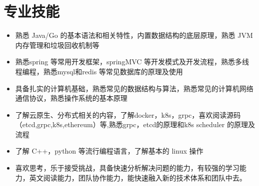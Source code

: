 \documentclass[letterpaper,11pt]{ctexart}
\makeatletter
\newcommand{\resumeItem}[1]{
  \item\small{
    {#1 \vspace{-2pt}}
  }
}
\newcommand{\resumeSubheading}[4]{
  \vspace{-2pt}\item
    \begin{tabular*}{1.0\textwidth}[t]{l@{\extracolsep{\fill}}r}
      \textbf{#1} & \textbf{\small #2} \\
      \textit{\small#3} & \textit{\small #4} \\
    \end{tabular*}\vspace{-7pt}
}
\newcommand{\resumeSubHeadingListStart}{\begin{itemize}[leftmargin=0.0in, label={}]}
\newcommand{\resumeSubHeadingListEnd}{\end{itemize}}
\newcommand{\resumeItemListStart}{\begin{itemize}}
\newcommand{\resumeItemListEnd}{\end{itemize}\vspace{-5pt}}
\makeatother
\begin{document}
%
\section{专业技能}
    \resumeItemListStart
    \resumeItem{熟悉 Java/Go 的基本语法和相关特性，内置数据结构的底层原理，熟悉 JVM 内存管理和垃圾回收机制等}
    \resumeItem{熟悉spring 等常用开发框架，springMVC 等开发模式及开发流程，熟悉多线程编程，熟悉mysql和redis 等常见数据库的原理及使用}
    \resumeItem{具备扎实的计算机基础，熟悉常见的数据结构与算法，熟悉常见的计算机网络通信协议，熟悉操作系统的基本原理}
    \resumeItem{了解云原生、分布式相关的内容，了解docker，k8s，grpc，喜欢阅读源码（etcd,grpc,k8s,ethereum）等,熟悉grpc，etcd的原理和k8s scheduler 的原理及流程}
    \resumeItem{了解 C++，python 等流行编程语言，了解基本的 linux 操作}
    \resumeItem{喜欢思考，乐于接受挑战，具备快速分析解决问题的能力，有较强的学习能力，英文阅读能力，团队协作能力，能快速融入新的技术体系和团队中去。}
    \resumeItemListEnd
 \vspace{-16pt}


%
\end{document}
